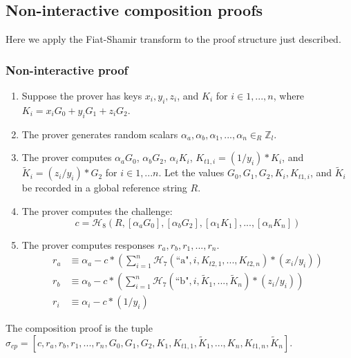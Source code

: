 \begin{appendices}
\subsection{Non-interactive composition proofs}
\label{appendix:noninteractive-composition-proofs}

Here we apply the Fiat-Shamir transform \cite{fiat-shamir-transform} to the proof structure just described.

\subsubsection{Non-interactive proof}

\begin{enumerate}
    \item Suppose the prover has keys $x_i, y_i, z_i$, and $K_i$ for $i \in 1,...,n$, where $K_i = x_i G_0 + y_i G_1 + z_i G_2$.

    \item The prover generates random scalars $\alpha_a, \alpha_b, \alpha_1, ..., \alpha_n \in_R \mathbb{Z}_l$.

    \item The prover computes $\alpha_a G_0$, $\alpha_b G_2$, $\alpha_i K_i$, $K_{t1,i} = (1/y_i)*K_i$, and $\tilde{K}_i = (z_i/y_i)*G_2$ for $i \in 1,...n$. Let the values $G_0, G_1, G_2, K_i, K_{t1,i}$, and $\tilde{K}_i$ be recorded in a global reference string $R$.

    \item The prover computes the challenge:
    \[c = \mathcal{H}_8(R, [\alpha_a G_0], [\alpha_b G_2], [\alpha_1 K_1],...,[\alpha_n K_n])\]

    \item The prover computes responses $r_a, r_b, r_1, ..., r_n$.\vspace{.115cm}
    \begin{align*}
        r_a &\equiv \alpha_a - c*(\sum^n_{i=1} \mathcal{H}_7(\textrm{``a"}, i, K_{t2,1},...,K_{t2,n})*(x_i/y_i)) \\
        r_b &\equiv \alpha_b - c*(\sum^n_{i=1} \mathcal{H}_7(\textrm{``b"}, i, \tilde{K}_1,...,\tilde{K}_n)*(z_i/y_i)) \\
        r_i &\equiv \alpha_i - c*(1/y_i)
    \end{align*}
\end{enumerate}

The composition proof is the tuple $\sigma_{cp} = [c, r_a, r_b, r_1, ..., r_n, G_0, G_1, G_2, K_1, K_{t1,1}, \tilde{K}_1, ..., K_n, K_{t1,n}, \tilde{K}_n]$.


\end{appendices}
